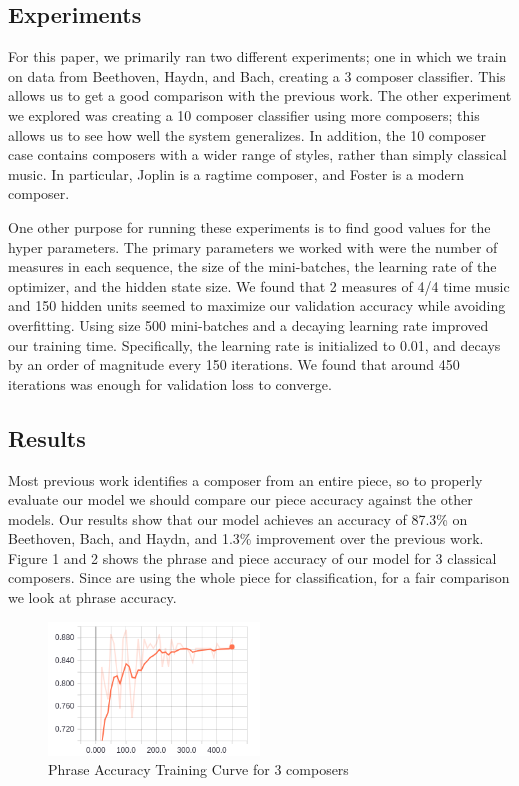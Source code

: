 \documentclass[11pt,a4paper]{article}
\begin{document}
\subsection{Experiments}
For this paper, we primarily ran two different experiments; one in which we train on data from Beethoven, Haydn, and Bach, creating a 3 composer classifier. This allows us to get a good comparison with the previous work. The other experiment we explored was creating a 10 composer classifier using more composers; this allows us to see how well the system generalizes. In addition, the 10 composer case contains composers with a wider range of styles, rather than simply classical music. In particular, Joplin is a ragtime composer, and Foster is a modern composer.

One other purpose for running these experiments is to find good values for the hyper parameters. The primary parameters we worked with were the number of measures in each sequence, the size of the mini-batches, the learning rate of the optimizer, and the hidden state size. We found that 2 measures of 4/4 time music and 150 hidden units seemed to maximize our validation accuracy while avoiding overfitting. Using size 500 mini-batches and a decaying learning rate improved our training time. Specifically, the learning rate is initialized to 0.01, and decays by an order of magnitude every 150 iterations. We found that around 450 iterations was enough for validation loss to converge.


\subsection{Results}
Most previous work identifies a composer from an entire piece, so to properly evaluate our model we should compare our piece accuracy against the other models. Our results show that our model achieves an accuracy of 87.3\% on Beethoven, Bach, and Haydn, and 1.3\% improvement over the previous work. 
Figure 1 and 2 shows the phrase and piece accuracy of our model for 3 classical composers. Since are using the whole piece for classification, for a fair comparison we look at phrase accuracy. 

\begin{figure}[h]
\caption{Phrase Accuracy Training Curve for 3 composers}
\centering
\includegraphics[width=0.5\textwidth]{3_com_phrase.png}
\end{figure}
\end{document}
